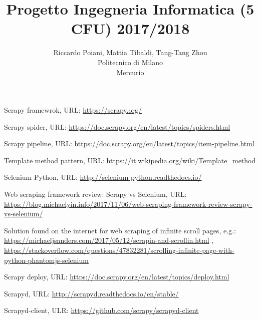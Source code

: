 \documentclass[a4paper]{article}
\begin{document}
\title{Progetto Ingegneria Informatica (5 CFU) 2017/2018}
\author{
        Riccardo Poiani, Mattia Tibaldi, Tang-Tang Zhou \\
        Politecnico di Milano\\  
        Mercurio              
}
\maketitle
\newpage
\tableofcontents
{}
\newpage



\clearpage
\begin{thebibliography}{9}
Scrapy framewrok, URL: \url{https://scrapy.org/}

Scrapy spider, URL: \url{https://doc.scrapy.org/en/latest/topics/spiders.html}

Scrapy pipeline, URL: \url{https://doc.scrapy.org/en/latest/topics/item-pipeline.html}

Template method pattern, URL: \url{https://it.wikipedia.org/wiki/Template_method}

Selenium Python, URL: \url{http://selenium-python.readthedocs.io/}

Web scraping framework review: Scrapy vs Selenium, URL: \url{https://blog.michaelyin.info/2017/11/06/web-scraping-framework-review-scrapy-vs-selenium/}

Solution found on the internet for web scraping of infinite scroll pages, e.g.: \url{https://michaeljsanders.com/2017/05/12/scrapin-and-scrollin.html} , \url{https://stackoverflow.com/questions/47832281/scrolling-infinite-page-with-python-phantomjs-selenium}

Scrapy deploy, URL: \url{https://doc.scrapy.org/en/latest/topics/deploy.html}

Scrapyd, URL: \url{http://scrapyd.readthedocs.io/en/stable/}

Scrapyd-client, ULR: \url{https://github.com/scrapy/scrapyd-client}

\end{thebibliography}
\end{document}
